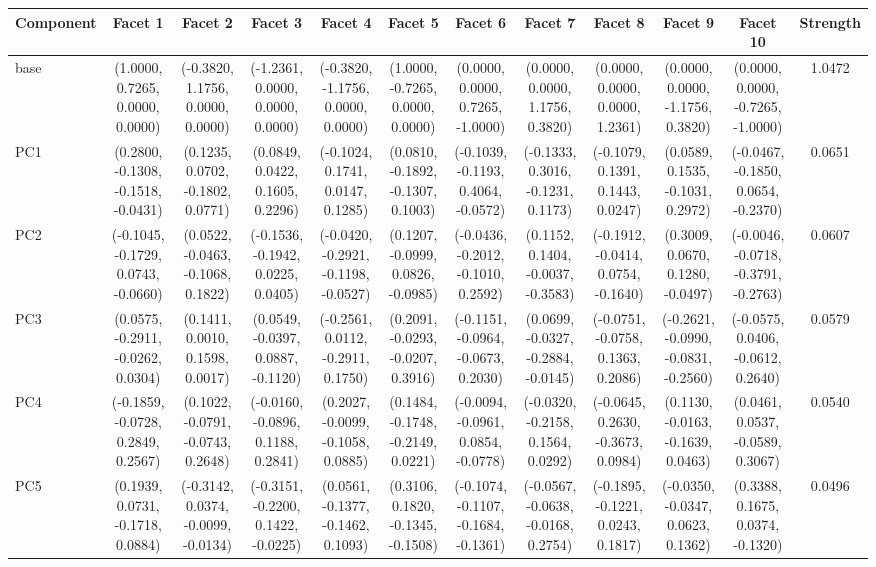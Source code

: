 \begin{table}[p]
\centering
\scriptsize
\setlength{\tabcolsep}{2pt}
\renewcommand{\arraystretch}{1.1}
\begin{tabular}{lccccccccccc}
\toprule
 Component & Facet 1 & Facet 2 & Facet 3 & Facet 4 & Facet 5 & Facet 6 & Facet 7 & Facet 8 & Facet 9 & Facet 10 & Strength \\
\midrule
 base & (1.0000, 0.7265, 0.0000, 0.0000) & (-0.3820, 1.1756, 0.0000, 0.0000) & (-1.2361, 0.0000, 0.0000, 0.0000) & (-0.3820, -1.1756, 0.0000, 0.0000) & (1.0000, -0.7265, 0.0000, 0.0000) & (0.0000, 0.0000, 0.7265, -1.0000) & (0.0000, 0.0000, 1.1756, 0.3820) & (0.0000, 0.0000, 0.0000, 1.2361) & (0.0000, 0.0000, -1.1756, 0.3820) & (0.0000, 0.0000, -0.7265, -1.0000) & 1.0472 \\
 PC1 & (0.2800, -0.1308, -0.1518, -0.0431) & (0.1235, 0.0702, -0.1802, 0.0771) & (0.0849, 0.0422, 0.1605, 0.2296) & (-0.1024, 0.1741, 0.0147, 0.1285) & (0.0810, -0.1892, -0.1307, 0.1003) & (-0.1039, -0.1193, 0.4064, -0.0572) & (-0.1333, 0.3016, -0.1231, 0.1173) & (-0.1079, 0.1391, 0.1443, 0.0247) & (0.0589, 0.1535, -0.1031, 0.2972) & (-0.0467, -0.1850, 0.0654, -0.2370) & 0.0651 \\
 PC2 & (-0.1045, -0.1729, 0.0743, -0.0660) & (0.0522, -0.0463, -0.1068, 0.1822) & (-0.1536, -0.1942, 0.0225, 0.0405) & (-0.0420, -0.2921, -0.1198, -0.0527) & (0.1207, -0.0999, 0.0826, -0.0985) & (-0.0436, -0.2012, -0.1010, 0.2592) & (0.1152, 0.1404, -0.0037, -0.3583) & (-0.1912, -0.0414, 0.0754, -0.1640) & (0.3009, 0.0670, 0.1280, -0.0497) & (-0.0046, -0.0718, -0.3791, -0.2763) & 0.0607 \\
 PC3 & (0.0575, -0.2911, -0.0262, 0.0304) & (0.1411, 0.0010, 0.1598, 0.0017) & (0.0549, -0.0397, 0.0887, -0.1120) & (-0.2561, 0.0112, -0.2911, 0.1750) & (0.2091, -0.0293, -0.0207, 0.3916) & (-0.1151, -0.0964, -0.0673, 0.2030) & (0.0699, -0.0327, -0.2884, -0.0145) & (-0.0751, -0.0758, 0.1363, 0.2086) & (-0.2621, -0.0990, -0.0831, -0.2560) & (-0.0575, 0.0406, -0.0612, 0.2640) & 0.0579 \\
 PC4 & (-0.1859, -0.0728, 0.2849, 0.2567) & (0.1022, -0.0791, -0.0743, 0.2648) & (-0.0160, -0.0896, 0.1188, 0.2841) & (0.2027, -0.0099, -0.1058, 0.0885) & (0.1484, -0.1748, -0.2149, 0.0221) & (-0.0094, -0.0961, 0.0854, -0.0778) & (-0.0320, -0.2158, 0.1564, 0.0292) & (-0.0645, 0.2630, -0.3673, 0.0984) & (0.1130, -0.0163, -0.1639, 0.0463) & (0.0461, 0.0537, -0.0589, 0.3067) & 0.0540 \\
 PC5 & (0.1939, 0.0731, -0.1718, 0.0884) & (-0.3142, 0.0374, -0.0099, -0.0134) & (-0.3151, -0.2200, 0.1422, -0.0225) & (0.0561, -0.1377, -0.1462, 0.1093) & (0.3106, 0.1820, -0.1345, -0.1508) & (-0.1074, -0.1107, -0.1684, -0.1361) & (-0.0567, -0.0638, -0.0168, 0.2754) & (-0.1895, -0.1221, 0.0243, 0.1817) & (-0.0350, -0.0347, 0.0623, 0.1362) & (0.3388, 0.1675, 0.0374, -0.1320) & 0.0496 \\

\end{tabular}
\end{table}

